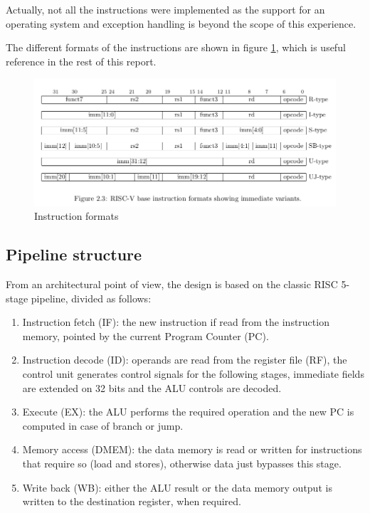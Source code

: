 \documentclass[a4paper]{article}
\begin{document}
Actually, not all the instructions were implemented as the support for an operating system and exception handling is beyond the scope of this experience.

The different formats of the instructions are shown in figure \ref{fig:formats}, which is useful reference in the rest of this report.

\begin{figure}[hbtp]
    \centering
    \includegraphics[width=\textwidth]{img/riscv_instructions_format.png}
    \caption{Instruction formats}
    \label{fig:formats}
\end{figure}

\subsection{Pipeline structure}
From an architectural point of view, the design is based on the classic RISC 5-stage pipeline, divided as follows:
\begin{enumerate}
    \item Instruction fetch (IF): the new instruction if read from the instruction memory, pointed by the current Program Counter (PC).
    \item Instruction decode (ID): operands are read from the register file (RF), the control unit generates control signals for the following stages, immediate fields are extended on 32 bits and the ALU controls are decoded.
    \item Execute (EX): the ALU performs the required operation and the new PC is computed in case of branch or jump.
    \item Memory access (DMEM): the data memory is read or written for instructions that require so (load and stores), otherwise data just bypasses this stage.
    \item Write back (WB): either the ALU result or the data memory output is written to the destination register, when required.
\end{enumerate}
\end{document}
